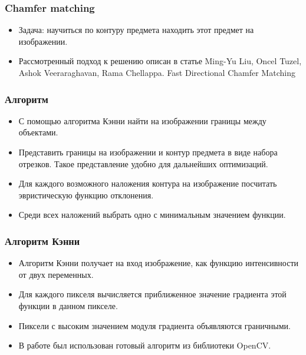 \begin{frame}\frametitle{Chamfer matching}
    \begin{itemize}
        \item Задача: научиться по контуру предмета находить этот предмет на изображении.
        \pause
        \item Рассмотренный подход к решению описан в статье
        Ming-Yu Liu, Oncel Tuzel, Ashok Veeraraghavan, Rama Chellappa. Fast Directional Chamfer Matching
    \end{itemize}
\end{frame}

\begin{frame}\frametitle{Алгоритм}
    \begin{itemize}
        \item С помощью алгоритма Кэнни найти на изображении границы между объектами.
        \pause
        \item Представить границы на изображении и контур предмета в виде набора отрезков.
        Такое представление удобно для дальнейших оптимизаций.
        \pause
        \item Для каждого возможного наложения контура на изображение посчитать эвристическую функцию отклонения.
        \pause
        \item Среди всех наложений выбрать одно с минимальным значением функции.
    \end{itemize}
\end{frame}

\begin{frame}\frametitle{Алгоритм Кэнни}
    \begin{itemize}
        \item Алгоритм Кэнни получает на вход изображение, как функцию интенсивности от двух переменных.
        \pause
        \item Для каждого пикселя вычисляется приближенное значение градиента этой функции в данном пикселе.
        \pause
        \item Пиксели с высоким значением модуля градиента объявляются граничными.
        \pause
        \item В работе был использован готовый алгоритм из библиотеки OpenCV.
    \end{itemize}
\end{frame}


